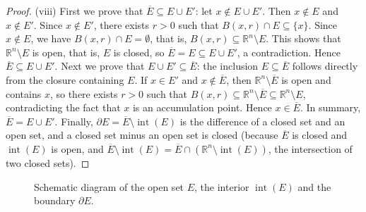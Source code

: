 \begin{proof}
(viii) First we prove that $\overline{E} \subseteq E \cup E'$: let $x \notin E \cup E'$. Then $x \notin E$ and $x \notin E'$. Since $x \notin E'$, there exists $r > 0$ such that $B(x, r) \cap E \subseteq \{x\}$. Since $x \notin E$, we have $B(x, r) \cap E = \emptyset$, that is, $B(x, r) \subseteq \mathbb{R}^n \setminus E$. This shows that $\mathbb{R}^n \setminus E$ is open, that is, $E$ is closed, so $\overline{E} = E \subseteq E \cup E'$, a contradiction. Hence $\overline{E} \subseteq E \cup E'$. Next we prove that $E \cup E' \subseteq \overline{E}$: the inclusion $E \subseteq \overline{E}$ follows directly from the closure containing $E$. If $x \in E'$ and $x \notin \overline{E}$, then $\mathbb{R}^n \setminus \overline{E}$ is open and contains $x$, so there exists $r > 0$ such that $B(x, r) \subseteq \mathbb{R}^n \setminus \overline{E} \subseteq \mathbb{R}^n \setminus E$, contradicting the fact that $x$ is an accumulation point. Hence $x \in \overline{E}$. In summary, $\overline{E} = E \cup E'$. Finally, $\partial E = \overline{E} \setminus \operatorname{int}(E)$ is the difference of a closed set and an open set, and a closed set minus an open set is closed (because $\overline{E}$ is closed and $\operatorname{int}(E)$ is open, and $\overline{E} \setminus \operatorname{int}(E) = \overline{E} \cap (\mathbb{R}^n \setminus \operatorname{int}(E))$, the intersection of two closed sets).
\end{proof}

\begin{figure}[htbp]
\centering
{}
\caption{Schematic diagram of the open set $E$, the interior $\operatorname{int}(E)$ and the boundary $\partial E$.}
\label{fig:open_set_interior_boundary}
\end{figure}

